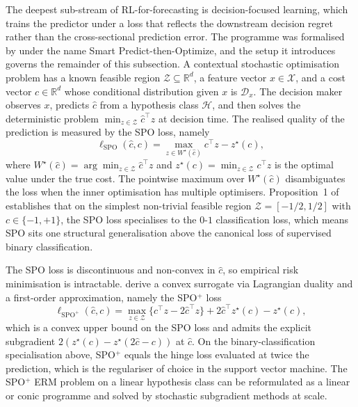 The deepest sub-stream of RL-for-forecasting is decision-focused learning, which
trains the predictor under a loss that reflects the downstream decision regret
rather than the cross-sectional prediction error. The programme was formalised by
\citet{ElmachtoubGrigas2022} under the name Smart Predict-then-Optimize, and the
setup it introduces governs the remainder of this subsection. A contextual
stochastic optimisation problem has a known feasible region $\mathcal Z \subseteq
\mathbb R^d$, a feature vector $x \in \mathcal X$, and a cost vector $c \in
\mathbb R^d$ whose conditional distribution given $x$ is $\mathcal D_x$. The
decision maker observes $x$, predicts $\hat c$ from a hypothesis class
$\mathcal H$, and then solves the deterministic problem
$\min_{z \in \mathcal Z} \hat c^\top z$ at decision time. The realised quality of
the prediction is measured by the SPO loss, namely
\begin{equation}
\ell_{\mathrm{SPO}}(\hat c, c) = \max_{z \in W^\star(\hat c)} c^\top z - z^\star(c),
\label{eq:spo_loss}
\end{equation}
where $W^\star(\hat c) = \arg\min_{z \in \mathcal Z} \hat c^\top z$ and
$z^\star(c) = \min_{z \in \mathcal Z} c^\top z$ is the optimal value under the
true cost. The pointwise maximum over $W^\star(\hat c)$ disambiguates the loss
when the inner optimisation has multiple optimisers. Proposition~1 of
\citet{ElmachtoubGrigas2022} establishes that on the simplest non-trivial
feasible region $\mathcal Z = [-1/2, 1/2]$ with $c \in \{-1, +1\}$, the SPO loss
specialises to the $0$-$1$ classification loss, which means SPO sits one structural
generalisation above the canonical loss of supervised binary classification.

The SPO loss is discontinuous and non-convex in $\hat c$, so empirical risk
minimisation is intractable. \citet{ElmachtoubGrigas2022} derive a convex
surrogate via Lagrangian duality and a first-order approximation, namely the
SPO$^+$ loss
\begin{equation}
\ell_{\mathrm{SPO}^+}(\hat c, c)
= \max_{z \in \mathcal Z}
  \bigl\{ c^\top z - 2 \hat c^\top z \bigr\}
  + 2 \hat c^\top z^\star(c) - z^\star(c),
\label{eq:spo_plus_loss}
\end{equation}
which is a convex upper bound on the SPO loss and admits the explicit subgradient
$2( z^\star(c) - z^\star(2 \hat c - c) )$ at $\hat c$. On the binary-classification
specialisation above, SPO$^+$ equals the hinge loss evaluated at twice the
prediction, which is the regulariser of choice in the support vector machine. The
SPO$^+$ ERM problem on a linear hypothesis class can be reformulated as a
linear or conic programme and solved by stochastic subgradient methods at scale.

